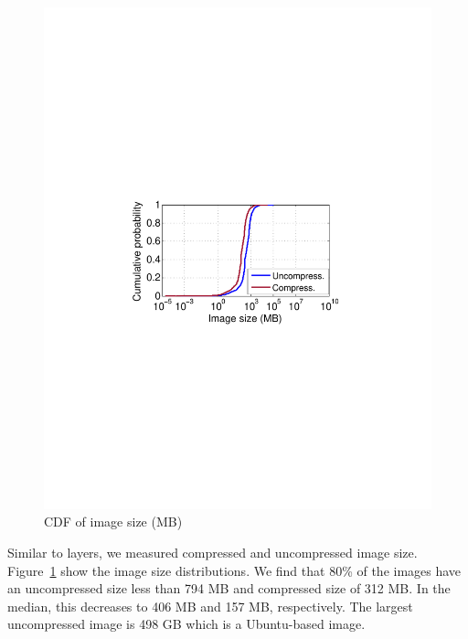 \begin{figure}[t]
\begin{minipage}{0.22\textwidth}
		\centering
		\includegraphics[width=1\textwidth]{graphs/image-size-cdf.pdf}
		\caption{CDF of image size (MB)}
		\label{fig:image-size-cdf}
	\end{minipage}%
\end{figure}

%

Similar to layers, we measured compressed and uncompressed image size. 
Figure~\ref{fig:image-size-cdf} show the image size distributions. 
We find that 80\% of the images have an uncompressed size less than
794 MB and compressed size of 312 MB.
In the median, this decreases to 406 MB and 157 MB, respectively. The largest
uncompressed image is 498 GB which is a Ubuntu-based image.  

